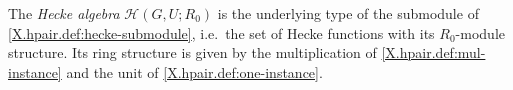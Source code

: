 The \emph{Hecke algebra} $\mathcal H(G,U;R_0)$ is the underlying type of the submodule of \cref{X.hpair.def:hecke-submodule}, i.e.\ the set of Hecke functions with its $R_0$-module structure. Its ring structure is given by the multiplication of \cref{X.hpair.def:mul-instance} and the unit of \cref{X.hpair.def:one-instance}.
